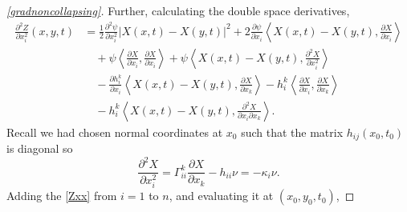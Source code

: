 \begin{proof}[\cref{gradnoncollapsing}]
    Further, calculating the double space derivatives, \begin{align}
        \frac{\partial^{2}Z}{\partial x_{i}^{2}}(x,y,t) & = \frac{1}{2}\frac{\partial^{2} \psi}{\partial x_{i}^{2}}|X(x,t)-X(y,t)|^{2} + 2\frac{\partial \psi}{\partial x_{i}}\left< X(x,t)-X(y,t), \frac{\partial X}{\partial x_{i}} \right> \nonumber \\
        & \quad + \psi \left< \frac{\partial X}{\partial x_{i}}, \frac{\partial X}{\partial x_{i}} \right> + \psi \left< X(x,t)-X(y,t), \frac{\partial^{2} X}{\partial x_{i}^{2}} \right> \nonumber \\
        & \quad - \frac{\partial h_{i}^{k}}{\partial x_{i}}\left< X(x,t)-X(y,t), \frac{\partial X}{\partial x_{k}} \right> - h_{i}^{k}\left< \frac{\partial X}{\partial x_{i}}, \frac{\partial X}{\partial x_{k}} \right>\nonumber \\
        & \quad - h_{i}^{k}\left< X(x,t)-X(y,t), \frac{\partial^{2}X}{\partial x_{i}\partial x_{k}} \right> .\label{Zxx}
    \end{align}
    Recall we had chosen normal coordinates at $ x_{0} $ such that the matrix $ h_{ij}(x_{0},t_{0}) $ is diagonal so
    \[ \frac{\partial^{2}X}{\partial x_{i}^{2}} = \Gamma_{ii}^{k}\frac{\partial X}{\partial x_{k}} -h_{ii}\nu = -\kappa_{i}\nu. \]
    Adding the \cref{Zxx} from $ i=1 $ to $ n $, and evaluating it at $ (x_{0},y_{0},t_{0}) $, 


\end{proof}
